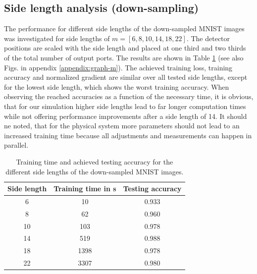 \subsection{Side length analysis (down-sampling)}
The performance for different side lengths of the down-sampled MNIST images was investigated for side lengths of $m=[6,8,10,14,18,22]$.
The detector positions are scaled with the side length and placed at one third and two thirds of the total number of output ports.
The results are shown in Table \ref{tab:side-length} (see also Figs. in appendix \ref{appendix:graph-m}).
The achieved training loss, training accuracy and normalized gradient are similar over all tested side lengths, except for the lowest side length, which shows the worst training accuracy.
When observing the reached accuracies as a function of the necessary time, it is obvious, that for our simulation higher side lengths lead to far longer computation times while not offering performance improvements after a side length of 14.
It should ne noted, that for the physical system more parameters should not lead to an increased training time because all adjustments and measurements can happen in parallel.
\begin{table}[H]
    \centering
    \caption{Training time and achieved testing accuracy for the different side lengths of the down-sampled MNIST images.}
    \begin{tabular}{|c|c|c|}
    \hline
    Side length & Training time in s & Testing accuracy\\
    \hline
        6 & 10 & 0.933\\
        8 & 62 & 0.960\\
        10 & 103 & 0.978\\
        14 & 519 & 0.988\\
        18 & 1398 & 0.978\\
        22 & 3307 &0.980\\
    \hline
    \end{tabular}
    \label{tab:side-length}
\end{table}

